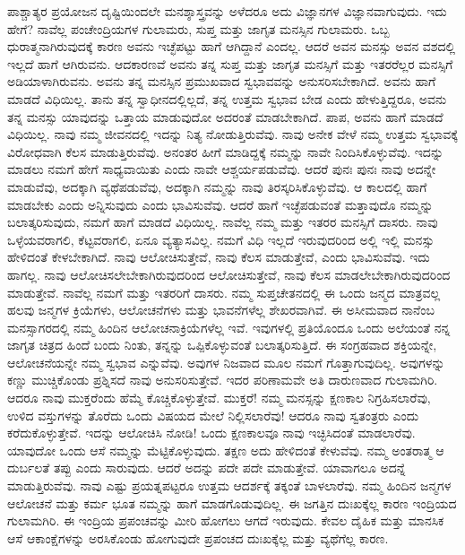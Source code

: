 ಪಾಶ್ಚಾತ್ಯರ ಪ್ರಯೋಜನ ದೃಷ್ಟಿಯಿಂದಲೇ ಮನಶ್ಶಾಸ್ತ್ರವನ್ನು ಅಳೆದರೂ ಅದು ವಿಜ್ಞಾನಗಳ ವಿಜ್ಞಾನವಾಗುವುದು. ಇದು ಹೇಗೆ? ನಾವೆಲ್ಲ ಪಂಚೇಂದ್ರಿಯಗಳ ಗುಲಾಮರು, ಸುಪ್ತ ಮತ್ತು ಜಾಗೃತ ಮನಸ್ಸಿನ ಗುಲಾಮರು. ಒಬ್ಬ ಧುರಾತ್ಮನಾಗಿರುವುದಕ್ಕೆ ಕಾರಣ ಅವನು ಇಚ್ಛೆಪಟ್ಟು ಹಾಗೆ ಆಗಿದ್ದಾನೆ ಎಂದಲ್ಲ. ಆದರೆ ಅವನ ಮನಸ್ಸು ಅವನ ವಶದಲ್ಲಿ ಇಲ್ಲದೆ ಹಾಗೆ ಆಗಿರುವನು. ಆದಕಾರಣವೆ ಅವನು ತನ್ನ ಸುಪ್ತ ಮತ್ತು ಜಾಗೃತ ಮನಸ್ಸಿಗೆ ಮತ್ತು ಇತರರೆಲ್ಲರ ಮನಸ್ಸಿಗೆ ಅಡಿಯಾಳಾಗಿರುವನು. ಅವನು ತನ್ನ ಮನಸ್ಸಿನ ಪ್ರಮುಖವಾದ ಸ್ವಭಾವವನ್ನು ಅನುಸರಿಸಬೇಕಾಗಿದೆ. ಅವನು ಹಾಗೆ ಮಾಡದೆ ವಿಧಿಯಿಲ್ಲ. ತಾನು ತನ್ನ ಸ್ವಾಧೀನದಲ್ಲಿಲ್ಲದೆ, ತನ್ನ ಉತ್ತಮ ಸ್ವಭಾವ ಬೇಡ ಎಂದು ಹೇಳುತ್ತಿದ್ದರೂ, ಅವನು ತನ್ನ ಮನಸ್ಸು ಯಾವುದನ್ನು ಒತ್ತಾಯ ಮಾಡುವುದೋ ಅದರಂತೆ ಮಾಡಬೇಕಾಗಿದೆ. ಪಾಪ, ಅವನು ಹಾಗೆ ಮಾಡದೆ ವಿಧಿಯಿಲ್ಲ. ನಾವು ನಮ್ಮ ಜೀವನದಲ್ಲಿ ಇದನ್ನು ನಿತ್ಯ ನೋಡುತ್ತಿರುವೆವು. ನಾವು ಅನೇಕ ವೇಳೆ ನಮ್ಮ ಉತ್ತಮ ಸ್ವಭಾವಕ್ಕೆ ವಿರೋಧವಾಗಿ ಕೆಲಸ ಮಾಡುತ್ತಿರುವೆವು. ಅನಂತರ ಹೀಗೆ ಮಾಡಿದ್ದಕ್ಕೆ ನಮ್ಮನ್ನು ನಾವೇ ನಿಂದಿಸಿಕೊಳ್ಳುವೆವು. ಇದನ್ನು ಮಾಡಲು ನಮಗೆ ಹೇಗೆ ಸಾಧ್ಯವಾಯಿತು ಎಂದು ನಾವೇ ಆಶ್ಚರ್ಯಪಡುವೆವು. ಆದರೆ ಪುನಃ ಪುನಃ ನಾವು ಅದನ್ನೇ ಮಾಡುವೆವು, ಅದಕ್ಕಾಗಿ ವ್ಯಥೆಪಡುವೆವು, ಅದಕ್ಕಾಗಿ ನಮ್ಮನ್ನು ನಾವು ತಿರಸ್ಕರಿಸಿಕೊಳ್ಳುವೆವು. ಆ ಕಾಲದಲ್ಲಿ ಹಾಗೆ ಮಾಡಬೇಕು ಎಂದು ಅನ್ನಿಸುವುದು ಎಂದು ಭಾವಿಸುವೆವು. ಆದರೆ ಹಾಗೆ ಇಚ್ಛೆಪಡುವಂತೆ ಮತ್ತಾವುದೊ ನಮ್ಮನ್ನು ಬಲಾತ್ಕರಿಸುವುದು, ನಮಗೆ ಹಾಗೆ ಮಾಡದೆ ವಿಧಿಯಿಲ್ಲ. ನಾವೆಲ್ಲ ನಮ್ಮ ಮತ್ತು ಇತರರ ಮನಸ್ಸಿಗೆ ದಾಸರು. ನಾವು ಒಳ್ಳೆಯವರಾಗಲಿ, ಕೆಟ್ಟವರಾಗಲಿ, ಏನೂ ವ್ಯತ್ಯಾಸವಿಲ್ಲ. ನಮಗೆ ವಿಧಿ ಇಲ್ಲದೆ ಇರುವುದರಿಂದ ಅಲ್ಲಿ ಇಲ್ಲಿ ಮನಸ್ಸು ಹೇಳಿದಂತೆ ಕೇಳಬೇಕಾಗಿದೆ. ನಾವು ಆಲೋಚಿಸುತ್ತೇವೆ, ನಾವು ಕೆಲಸ ಮಾಡುತ್ತೇವೆ, ಎಂದು ಭಾವಿಸುವೆವು. ಇದು ಹಾಗಲ್ಲ. ನಾವು ಆಲೋಚಿಸಲೇಬೇಕಾಗಿರುವುದರಿಂದ ಆಲೋಚಿಸುತ್ತೇವೆ, ನಾವು ಕೆಲಸ ಮಾಡಲೇಬೇಕಾಗಿರುವುದರಿಂದ ಮಾಡುತ್ತೇವೆ. ನಾವೆಲ್ಲ ನಮಗೆ ಮತ್ತು ಇತರರಿಗೆ ದಾಸರು. ನಮ್ಮ ಸುಪ್ತಚೇತನದಲ್ಲಿ ಈ ಒಂದು ಜನ್ಮದ ಮಾತ್ರವಲ್ಲ ಹಲವು ಜನ್ಮಗಳ ಕ್ರಿಯೆಗಳು, ಆಲೋಚನೆಗಳು ಮತ್ತು ಭಾವನೆಗಳೆಲ್ಲ ಶೇಖರವಾಗಿವೆ. ಈ ಅಸೀಮವಾದ ನಾನೆಂಬ ಮನಸ್ಸಾಗರದಲ್ಲಿ ನಮ್ಮ ಹಿಂದಿನ ಆಲೋಚನಾಕ್ರಿಯೆಗಳೆಲ್ಲ ಇವೆ. ಇವುಗಳಲ್ಲಿ ಪ್ರತಿಯೊಂದೂ ಒಂದು ಅಲೆಯಂತೆ ನನ್ನ ಜಾಗೃತ ಚಿತ್ರದ ಹಿಂದೆ ಬಂದು ನಿಂತು, ತನ್ನನ್ನು ಒಪ್ಪಿಕೊಳ್ಳುವಂತೆ ಬಲಾತ್ಕರಿಸುತ್ತಿದೆ. ಈ ಸಂಗ್ರಹವಾದ ಶಕ್ತಿಯನ್ನೇ, ಆಲೋಚನೆಯನ್ನೇ ನಮ್ಮ ಸ್ವಭಾವ ಎನ್ನುವೆವು. ಅವುಗಳ ನಿಜವಾದ ಮೂಲ ನಮಗೆ ಗೊತ್ತಾಗುವುದಿಲ್ಲ. ಅವುಗಳನ್ನು ಕಣ್ಣು ಮುಚ್ಚಿಕೊಂಡು ಪ್ರಶ್ನಿಸದೆ ನಾವು ಅನುಸರಿಸುತ್ತೇವೆ. ಇದರ ಪರಿಣಾಮವೇ ಅತಿ ದಾರುಣವಾದ ಗುಲಾಮಗಿರಿ. ಆದರೂ ನಾವು ಮುಕ್ತರೆಂದು ಹೆಮ್ಮೆ ಕೊಚ್ಚಿಕೊಳ್ಳುತ್ತೇವೆ. ಮುಕ್ತರೆ! ನಮ್ಮ ಮನಸ್ಸನ್ನು ಕ್ಷಣಕಾಲ ನಿಗ್ರಹಿಸಲಾರೆವು, ಉಳಿದ ವಸ್ತುಗಳನ್ನು ತೊರೆದು ಒಂದು ವಿಷಯದ ಮೇಲೆ ನಿಲ್ಲಿಸಲಾರೆವು! ಆದರೂ ನಾವು ಸ್ವತಂತ್ರರು ಎಂದು ಕರೆದುಕೊಳ್ಳುತ್ತೇವೆ. ಇದನ್ನು ಆಲೋಚಿಸಿ ನೋಡಿ! ಒಂದು ಕ್ಷಣಕಾಲವೂ ನಾವು ಇಚ್ಛಿಸಿದಂತೆ ಮಾಡಲಾರೆವು. ಯಾವುದೋ ಒಂದು ಆಸೆ ನಮ್ಮನ್ನು ಮೆಟ್ಟಿಕೊಳ್ಳುವುದು. ತಕ್ಷಣ ಅದು ಹೇಳಿದಂತೆ ಕೇಳುವೆವು. ನಮ್ಮ ಅಂತರಾತ್ಮ ಆ ದುರ್ಬಲತೆ ತಪ್ಪು ಎಂದು ಸಾರುವುದು. ಆದರೆ ಅದನ್ನು ಪದೇ ಪದೇ ಮಾಡುತ್ತೇವೆ. ಯಾವಾಗಲೂ ಅದನ್ನೆ ಮಾಡುತ್ತಿರುವೆವು. ನಾವು ಎಷ್ಟು ಪ್ರಯತ್ನಪಟ್ಟರೂ ಉತ್ತಮ ಆದರ್ಶಕ್ಕೆ ತಕ್ಕಂತೆ ಬಾಳಲಾರೆವು. ನಮ್ಮ ಹಿಂದಿನ ಜನ್ಮಗಳ ಆಲೋಚನೆ ಮತ್ತು ಕರ್ಮ ಭೂತ ನಮ್ಮನ್ನು ಹಾಗೆ ಮಾಡಗೊಡುವುದಿಲ್ಲ. ಈ ಜಗತ್ತಿನ ದುಃಖಕ್ಕೆಲ್ಲ ಕಾರಣ ಇಂದ್ರಿಯದ ಗುಲಾಮಗಿರಿ. ಈ ಇಂದ್ರಿಯ ಪ್ರಪಂಚವನ್ನು ಮೀರಿ ಹೋಗಲು ಆಗದೆ ಇರುವುದು. ಕೇವಲ ದೈಹಿಕ ಮತ್ತು ಮಾನಸಿಕ ಆಸೆ ಆಕಾಂಕ್ಷೆಗಳನ್ನು ಅರಸಿಕೊಂಡು ಹೋಗುವುದೇ ಪ್ರಪಂಚದ ದುಃಖಕ್ಕೆಲ್ಲ ಮತ್ತು ವ್ಯಥೆಗೆಲ್ಲ ಕಾರಣ.

